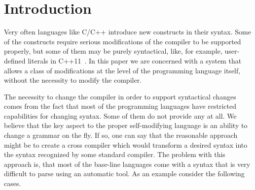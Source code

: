 \section{\label{sec:intro}Introduction}

Very often languages like C/C++ introduce new constructs in their
syntax.  Some of the constructs require serious modifications of the
compiler to be supported properly, but some of them may be purely syntactical,
like, for example, user-defined literals in C++11~\cite{cpp11}.  In this 
paper we are
concerned with a system that allows a class of modifications at the 
level of the programming language itself, without the necessity to
modify the compiler.

The necessity to change the compiler in order to support syntactical 
changes comes from the fact that most of the programming languages 
have restricted capabilities for changing syntax.  Some of them do not
provide any at all.  We believe that the key
aspect to the proper self-modifying language is an ability to 
change a grammar on the fly.  If so, one can say that the
reasonable approach might be to create a cross compiler which
would transform a desired syntax into the syntax recognized by
some standard compiler.  The problem with this approach is, that most of
the base-line languages come with a syntax that is very difficult
to parse using an automatic tool.  As an example consider the 
following cases.



